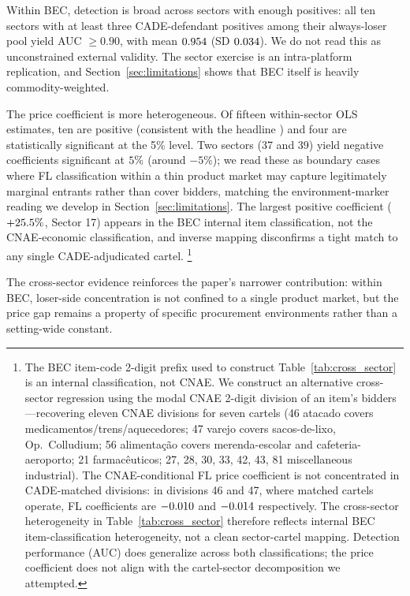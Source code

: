 Within BEC, detection is broad across sectors with enough
positives: all ten sectors with at least three CADE-defendant
positives among their always-loser pool yield AUC $\geq 0.90$,
with mean $0.954$ (SD $0.034$).
We do not read this as unconstrained external validity. The
sector exercise is an intra-platform replication, and
Section~\ref{sec:limitations} shows that BEC itself is heavily
commodity-weighted.

The price coefficient is more heterogeneous. Of fifteen
within-sector OLS estimates, ten are positive (consistent with
the headline \valPctSixfour) and four are statistically significant at
the 5\% level. Two sectors (37 and 39) yield negative coefficients
significant at $5\%$ (around $-5\%$); we read these as boundary
cases where FL classification within a thin product market may
capture legitimately marginal entrants rather than cover bidders,
matching the environment-marker reading we develop in
Section~\ref{sec:limitations}. The largest positive coefficient ($+25.5\%$, Sector 17) appears in
the BEC internal item classification, not the CNAE-economic
classification, and inverse mapping disconfirms a tight match to
any single CADE-adjudicated cartel.%
\footnote{The BEC item-code 2-digit prefix used to construct
Table~\ref{tab:cross_sector} is an internal classification, not
CNAE. We construct an alternative cross-sector regression using
the modal CNAE 2-digit division of an item's bidders---recovering
eleven CNAE divisions for seven cartels (46 atacado covers
medicamentos/trens/aquecedores; 47 varejo covers sacos-de-lixo,
Op.\ Colludium; 56 alimentação covers merenda-escolar and
cafeteria-aeroporto; 21 farmacêuticos; 27, 28, 30, 33, 42, 43, 81
miscellaneous industrial). The CNAE-conditional FL price
coefficient is not concentrated in CADE-matched divisions: in
divisions 46 and 47, where matched cartels operate, FL coefficients
are $-0.010$ and $-0.014$ respectively. The cross-sector
heterogeneity in Table~\ref{tab:cross_sector} therefore reflects
internal BEC item-classification heterogeneity, not a clean
sector-cartel mapping. Detection performance (AUC) does generalize
across both classifications; the price coefficient does not align
with the cartel-sector decomposition we attempted.}

The cross-sector evidence reinforces the paper's narrower
contribution: within BEC, loser-side concentration is not
confined to a single product market, but the price gap remains a
property of specific procurement environments rather than a
setting-wide constant.


